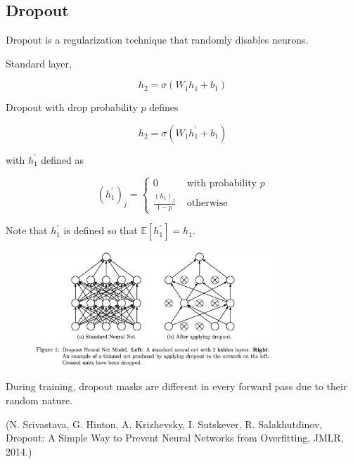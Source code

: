 \subsection{Dropout}

\begin{definition}[6.11][Dropout]
    Dropout is a regularization technique that randomly disables neurons.

    Standard layer,

    $$
    h_{2}=\sigma\left(W_{1} h_{1}+b_{1}\right)
    $$

    Dropout with drop probability $p$ defines

    $$
    h_{2}=\sigma\left(W_{1} h_{1}^{\prime}+b_{1}\right)
    $$

    with $h_{1}^{\prime}$ defined as

    $$
    \left(h_{1}^{\prime}\right)_{j}= \begin{cases}0 & \text { with probability } p \\ \frac{\left(h_{1}\right)_{j}}{1-p} & \text { otherwise }\end{cases}
    $$

    Note that $h_{1}^{\prime}$ is defined so that $\mathbb{E}[h_{1}^{\prime}]=h_1$.

    \begin{figure}[H]
        \centering
        \includegraphics[width=0.8\textwidth]{.././assets/6.6.png}
    \end{figure}

    During training, dropout masks are different in every forward pass due to their random nature.

    (N. Srivastava, G. Hinton, A. Krizhevsky, I. Sutskever, R. Salakhutdinov, Dropout: A Simple Way to Prevent Neural Networks from Overfitting, JMLR, 2014.)
\end{definition}

